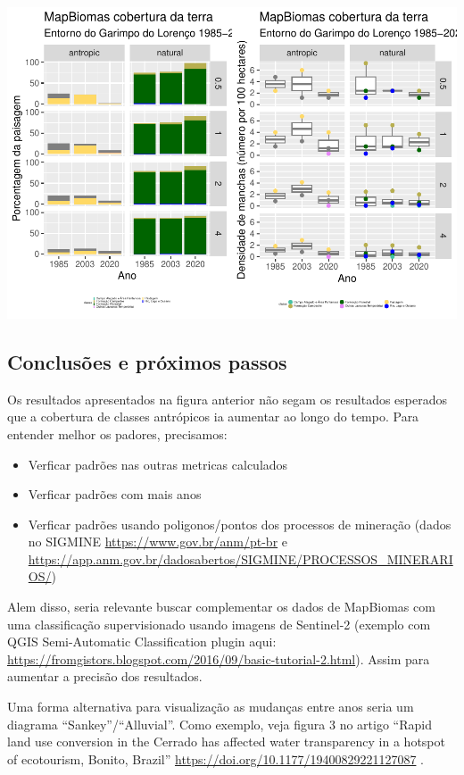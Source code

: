 \documentclass[
]{article}
\providecommand{\tightlist}{%
  \setlength{\itemsep}{0pt}\setlength{\parskip}{0pt}}
\begin{document}
\includegraphics{epr_files/figure-latex/unnamed-chunk-75-1.pdf}

\newpage

\hypertarget{conclusuxf5es-e-pruxf3ximos-passos}{%
\subsection{Conclusões e próximos passos}\label{conclusuxf5es-e-pruxf3ximos-passos}}

Os resultados apresentados na figura anterior não segam os resultados esperados que a cobertura de classes antrópicos ia aumentar ao longo do tempo.
Para entender melhor os padores, precisamos:

\begin{itemize}
\tightlist
\item
  Verficar padrões nas outras metricas calculados
\item
  Verficar padrões com mais anos
\item
  Verficar padrões usando poligonos/pontos dos processos de mineração (dados no SIGMINE \url{https://www.gov.br/anm/pt-br} e \url{https://app.anm.gov.br/dadosabertos/SIGMINE/PROCESSOS_MINERARIOS/})
\end{itemize}

Alem disso, seria relevante buscar complementar os dados de MapBiomas com uma classificação supervisionado usando imagens de Sentinel-2 (exemplo com QGIS Semi-Automatic Classification plugin aqui: \url{https://fromgistors.blogspot.com/2016/09/basic-tutorial-2.html}). Assim para aumentar a precisão dos resultados.

Uma forma alternativa para visualização as mudanças entre anos seria um diagrama ``Sankey''/``Alluvial''. Como exemplo, veja figura 3 no artigo ``Rapid land use conversion in the Cerrado has affected water transparency in a hotspot of ecotourism, Bonito, Brazil'' \url{https://doi.org/10.1177/19400829221127087} .
\end{document}
